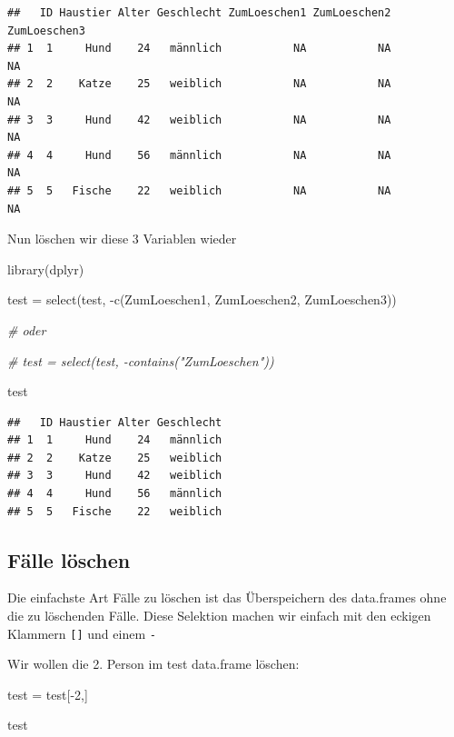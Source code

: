 \documentclass[
]{book}
\newenvironment{Shaded}{\begin{snugshade}}{\end{snugshade}}
\newcommand{\CommentTok}[1]{\textcolor[rgb]{0.56,0.35,0.01}{\textit{#1}}}
\newcommand{\DecValTok}[1]{\textcolor[rgb]{0.00,0.00,0.81}{#1}}
\newcommand{\FunctionTok}[1]{\textcolor[rgb]{0.00,0.00,0.00}{#1}}
\newcommand{\NormalTok}[1]{#1}
\newcommand{\OtherTok}[1]{\textcolor[rgb]{0.56,0.35,0.01}{#1}}
\newcommand{\SpecialCharTok}[1]{\textcolor[rgb]{0.00,0.00,0.00}{#1}}
\begin{document}
\begin{verbatim}
##   ID Haustier Alter Geschlecht ZumLoeschen1 ZumLoeschen2 ZumLoeschen3
## 1  1     Hund    24   männlich           NA           NA           NA
## 2  2    Katze    25   weiblich           NA           NA           NA
## 3  3     Hund    42   weiblich           NA           NA           NA
## 4  4     Hund    56   männlich           NA           NA           NA
## 5  5   Fische    22   weiblich           NA           NA           NA
\end{verbatim}

Nun löschen wir diese 3 Variablen wieder

\begin{Shaded}
\begin{Highlighting}[]
\FunctionTok{library}\NormalTok{(dplyr)}

\NormalTok{test }\OtherTok{=} \FunctionTok{select}\NormalTok{(test, }\SpecialCharTok{{-}}\FunctionTok{c}\NormalTok{(ZumLoeschen1, ZumLoeschen2, ZumLoeschen3))}

\CommentTok{\# oder }

\CommentTok{\# test = select(test, {-}contains("ZumLoeschen"))}

\NormalTok{test}
\end{Highlighting}
\end{Shaded}

\begin{verbatim}
##   ID Haustier Alter Geschlecht
## 1  1     Hund    24   männlich
## 2  2    Katze    25   weiblich
## 3  3     Hund    42   weiblich
## 4  4     Hund    56   männlich
## 5  5   Fische    22   weiblich
\end{verbatim}

\hypertarget{fuxe4lle-luxf6schen}{%
\subsection{Fälle löschen}\label{fuxe4lle-luxf6schen}}

Die einfachste Art Fälle zu löschen ist das Überspeichern des data.frames ohne die zu löschenden Fälle. Diese Selektion machen wir einfach mit den eckigen Klammern \texttt{{[}{]}} und einem \texttt{-}

Wir wollen die 2. Person im test data.frame löschen:

\begin{Shaded}
\begin{Highlighting}[]
\NormalTok{test }\OtherTok{=}\NormalTok{ test[}\SpecialCharTok{{-}}\DecValTok{2}\NormalTok{,]}

\NormalTok{test}
\end{Highlighting}
\end{Shaded}
\end{document}
